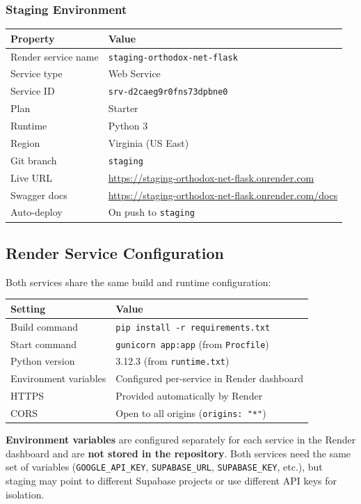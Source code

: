 \documentclass[12pt]{article}
\begin{document}
\subsubsection{Staging Environment}

\begin{longtable}{lp{9cm}}
\toprule
\textbf{Property} & \textbf{Value} \\
\midrule
Render service name & \texttt{staging-orthodox-net-flask} \\
Service type & Web Service \\
Service ID & \texttt{srv-d2caeg9r0fns73dpbne0} \\
Plan & Starter \\
Runtime & Python 3 \\
Region & Virginia (US East) \\
Git branch & \texttt{staging} \\
Live URL & \url{https://staging-orthodox-net-flask.onrender.com} \\
Swagger docs & \url{https://staging-orthodox-net-flask.onrender.com/docs} \\
Auto-deploy & On push to \texttt{staging} \\
\bottomrule
\end{longtable}

\subsection{Render Service Configuration}

Both services share the same build and runtime configuration:

\begin{longtable}{ll}
\toprule
\textbf{Setting} & \textbf{Value} \\
\midrule
Build command & \texttt{pip install -r requirements.txt} \\
Start command & \texttt{gunicorn app:app} (from \texttt{Procfile}) \\
Python version & 3.12.3 (from \texttt{runtime.txt}) \\
Environment variables & Configured per-service in Render dashboard \\
HTTPS & Provided automatically by Render \\
CORS & Open to all origins (\texttt{origins: "*"}) \\
\bottomrule
\end{longtable}

\textbf{Environment variables} are configured separately for each service in the Render dashboard and are \textbf{not stored in the repository}. Both services need the same set of variables (\texttt{GOOGLE\_API\_KEY}, \texttt{SUPABASE\_URL}, \texttt{SUPABASE\_KEY}, etc.), but staging may point to different Supabase projects or use different API keys for isolation.
\end{document}
